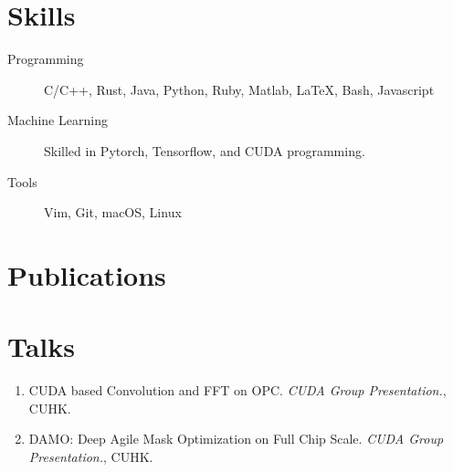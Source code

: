 \documentclass{mycv}
\begin{document}
\section{Skills}

\begin{description}
  \item[Programming] C/C++, Rust, Java, Python, Ruby, Matlab, \LaTeX, Bash, Javascript
  \item[Machine Learning] Skilled in Pytorch, Tensorflow, and CUDA programming.
  \item[Tools] Vim, Git, macOS, Linux
\end{description}

\section{Publications}%


\section{Talks}

\begin{enumerate}
  \item CUDA based Convolution and FFT on OPC. \emph{CUDA Group Presentation.}, CUHK. 
  \item DAMO: Deep Agile Mask Optimization on Full Chip Scale. \emph{CUDA Group Presentation.}, CUHK. 
\end{enumerate}
\end{document}
